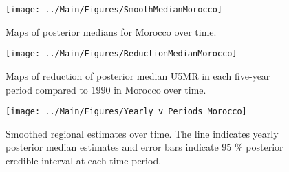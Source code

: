 \documentclass[12pt]{article}\usepackage[]{graphicx}\usepackage[]{color}
\newenvironment{knitrout}{}{} %
\begin{document}
\begin{knitrout}
\color{fgcolor}\begin{figure}[bht]

{\centering \texttt{[image: ../Main/Figures/SmoothMedianMorocco]} 

}

\caption[Maps of posterior medians for Morocco  over time]{Maps of posterior medians for Morocco  over time.}\label{fig:unnamed-chunk-224}
\end{figure}


\end{knitrout}
\begin{knitrout}
\color{fgcolor}\begin{figure}[bht]

{\centering \texttt{[image: ../Main/Figures/ReductionMedianMorocco]} 

}

\caption[Maps of reduction of posterior median U5MR in each five-year period compared to 1990 in Morocco over time]{Maps of reduction of posterior median U5MR in each five-year period compared to 1990 in Morocco over time.}\label{fig:unnamed-chunk-225}
\end{figure}


\end{knitrout}
\begin{knitrout}
\color{fgcolor}\begin{figure}[bht]

{\centering \texttt{[image: ../Main/Figures/Yearly\_v\_Periods\_Morocco]} 

}

\caption[Smoothed regional estimates over time]{Smoothed regional estimates over time. The line indicates yearly posterior median estimates and error bars indicate 95 \% posterior credible interval at each time period.}\label{fig:unnamed-chunk-226}
\end{figure}


\end{knitrout}
\end{document}
